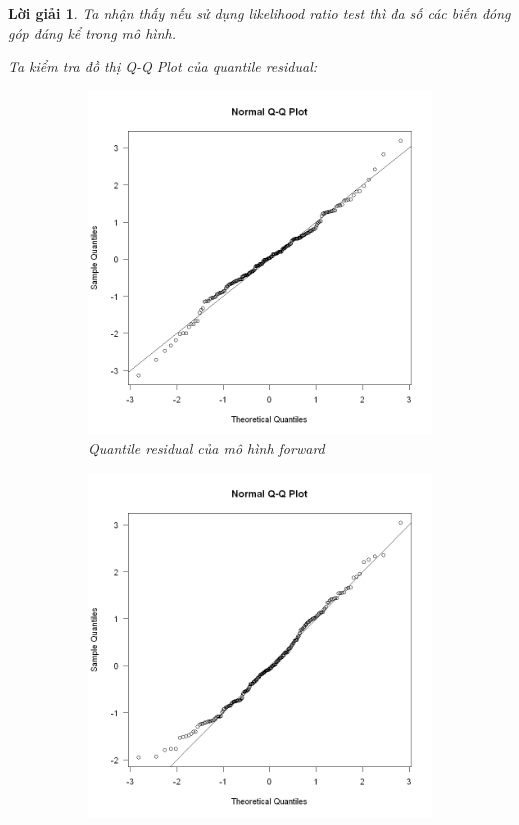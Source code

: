 \documentclass[14pt, a4paper]{article}
\theoremstyle{sltheorem}
\theoremstyle{soltheorem}
\newtheorem*{loigiai}{Lời giải}
\begin{document}
\begin{loigiai}
    Ta nhận thấy nếu sử dụng likelihood ratio test thì đa số các biến đóng góp đáng kể trong mô hình.

    Ta kiểm tra đồ thị Q-Q Plot của quantile residual:

    \begin{figure}[h!]
        \centering
        \begin{subfigure}[b]{0.4\textwidth}
            \centering
            \includegraphics[width=\textwidth]{figures/mf_quantile_resid.png}
            \caption{Quantile residual của mô hình forward}
        \end{subfigure}
        \hfill
        \begin{subfigure}[b]{0.4\textwidth}
            \centering
            \includegraphics[width=\textwidth]{figures/mb_quantile_resid.png}

\end{subfigure}
\end{figure}
\end{loigiai}
\end{document}
